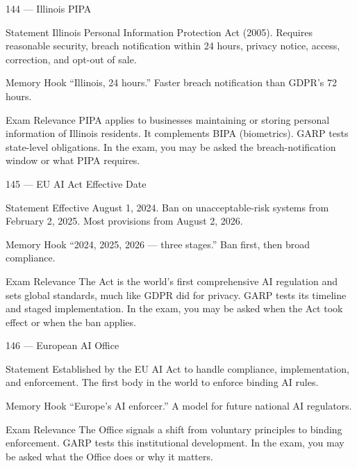 \documentclass[aspectratio=169,8pt]{beamer}
\begin{document}
	\begin{frame}{144 --- Illinois PIPA}
		\begin{block}{Statement}
			Illinois Personal Information Protection Act (2005). Requires reasonable security, breach notification within 24 hours, privacy notice, access, correction, and opt-out of sale.
		\end{block}
		\begin{block}{Memory Hook}
			``Illinois, 24 hours.'' Faster breach notification than GDPR's 72 hours.
		\end{block}
		\begin{block}{Exam Relevance}
			PIPA applies to businesses maintaining or storing personal information of Illinois residents. It complements BIPA (biometrics). GARP tests state-level obligations. In the exam, you may be asked the breach-notification window or what PIPA requires.
		\end{block}
	\end{frame}
	
	\begin{frame}{145 --- EU AI Act Effective Date}
		\begin{block}{Statement}
			Effective August 1, 2024. Ban on unacceptable-risk systems from February 2, 2025. Most provisions from August 2, 2026.
		\end{block}
		\begin{block}{Memory Hook}
			``2024, 2025, 2026 --- three stages.'' Ban first, then broad compliance.
		\end{block}
		\begin{block}{Exam Relevance}
			The Act is the world's first comprehensive AI regulation and sets global standards, much like GDPR did for privacy. GARP tests its timeline and staged implementation. In the exam, you may be asked when the Act took effect or when the ban applies.
		\end{block}
	\end{frame}
	
	\begin{frame}{146 --- European AI Office}
		\begin{block}{Statement}
			Established by the EU AI Act to handle compliance, implementation, and enforcement. The first body in the world to enforce binding AI rules.
		\end{block}
		\begin{block}{Memory Hook}
			``Europe's AI enforcer.'' A model for future national AI regulators.
		\end{block}
		\begin{block}{Exam Relevance}
			The Office signals a shift from voluntary principles to binding enforcement. GARP tests this institutional development. In the exam, you may be asked what the Office does or why it matters.
		\end{block}
	\end{frame}
	
\end{document}

